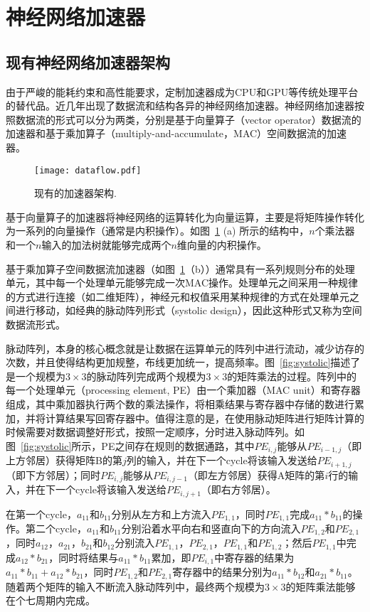 \section{神经网络加速器}


\subsection{现有神经网络加速器架构}
由于严峻的能耗约束和高性能要求，定制加速器成为CPU和GPU等传统处理平台的替代品。近几年出现了数据流和结构各异的神经网络加速器。神经网络加速器按照数据流的形式可以分为两类，分别是基于向量算子（vector operator）数据流的加速器和基于乘加算子（multiply-and-accumulate，MAC）空间数据流的加速器。

\begin{figure}[h]
  \centering
  \texttt{[image: dataflow.pdf]}
  \caption{\footnotesize 现有的加速器架构.}
  \label{fig:dataflow}
\end{figure}

基于向量算子的加速器将神经网络的运算转化为向量运算，主要是将矩阵操作转化为一系列的向量操作（通常是内积操作）。如图~\ref{fig:dataflow} (a) 所示的结构中，$n$个乘法器和一个$n$输入的加法树就能够完成两个$n$维向量的内积操作。

基于乘加算子空间数据流加速器（如图~\ref{fig:dataflow}（b））通常具有一系列规则分布的处理单元，其中每一个处理单元能够完成一次MAC操作。处理单元之间采用一种规律的方式进行连接（如二维矩阵），神经元和权值采用某种规律的方式在处理单元之间进行移动，如经典的脉动阵列形式（systolic design），因此这种形式又称为空间数据流形式。

脉动阵列，本身的核心概念就是让数据在运算单元的阵列中进行流动，减少访存的次数，并且使得结构更加规整，布线更加统一，提高频率。图~\ref{fig:systolic}描述了是一个规模为$3\times 3$的脉动阵列完成两个规模为$3\times 3$的矩阵乘法的过程。阵列中的每一个处理单元（processing element, PE）由一个乘加器（MAC unit）和寄存器组成，其中乘加器执行两个数的乘法操作，将相乘结果与寄存器中存储的数进行累加，并将计算结果写回寄存器中。值得注意的是，在使用脉动矩阵进行矩阵计算的时候需要对数据调整好形式，按照一定顺序，分时进入脉动阵列。如图~\ref{fig:systolic}所示，PE之间存在规则的数据通路，其中$PE_{i,j}$能够从$PE_{i-1,j}$（即上方邻居）获得矩阵B的第$j$列的输入，并在下一个cycle将该输入发送给$PE_{i+1,j}$（即下方邻居）；同时$PE_{i,j}$能够从$PE_{i,j-1}$（即左方邻居）获得A矩阵的第$i$行的输入，并在下一个cycle将该输入发送给$PE_{i,j+1}$（即右方邻居）。

在第一个cycle，$a_{11}$和$b_{11}$分别从左方和上方流入$PE_{1,1}$，同时$PE_{1,1}$完成$a_{11}*b_{11}$的操作。第二个cycle，$a_{11}$和$b_{11}$分别沿着水平向右和竖直向下的方向流入$PE_{1,2}$和$PE_{2,1}$，同时$a_{12}$，$a_{21}$，$b_{21}$和$b_{12}$分别流入$PE_{1,1}$，$PE_{2,1}$，$PE_{1,1}$和$PE_{1,2}$；然后$PE_{1,1}$中完成$a_{12}*b_{21}$，同时将结果与$a_{11}*b_{11}$累加，即$PE_{i,1}$中寄存器的结果为$a_{11}*b_{11}+a_{12}*b_{21}$，同时$PE_{1,2}$和$PE_{2,1}$寄存器中的结果分别为$a_{11}*b_{12}$和$a_{21}*b_{11}$。随着两个矩阵的输入不断流入脉动阵列中，最终两个规模为$3\times 3$的矩阵乘法能够在个七周期内完成。

